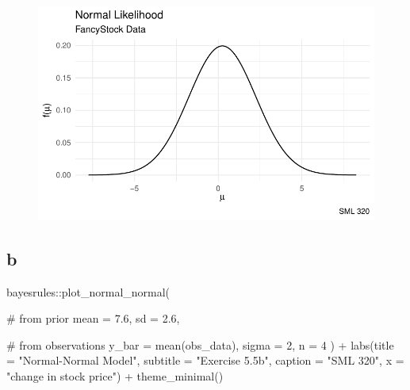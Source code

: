 \documentclass[
  letterpaper,
  DIV=11,
  numbers=noendperiod]{scrartcl}
\newenvironment{Shaded}{\begin{snugshade}}{\end{snugshade}}
\newcommand{\AttributeTok}[1]{\textcolor[rgb]{0.40,0.45,0.13}{#1}}
\newcommand{\CommentTok}[1]{\textcolor[rgb]{0.37,0.37,0.37}{#1}}
\newcommand{\DecValTok}[1]{\textcolor[rgb]{0.68,0.00,0.00}{#1}}
\newcommand{\FloatTok}[1]{\textcolor[rgb]{0.68,0.00,0.00}{#1}}
\newcommand{\FunctionTok}[1]{\textcolor[rgb]{0.28,0.35,0.67}{#1}}
\newcommand{\NormalTok}[1]{\textcolor[rgb]{0.00,0.23,0.31}{#1}}
\newcommand{\SpecialCharTok}[1]{\textcolor[rgb]{0.37,0.37,0.37}{#1}}
\newcommand{\StringTok}[1]{\textcolor[rgb]{0.13,0.47,0.30}{#1}}
\begin{document}
\begin{figure}[H]

{\centering \includegraphics{ps4_code_files/figure-pdf/unnamed-chunk-9-1.pdf}

}

\end{figure}

\hypertarget{b-3}{%
\subsection{b}\label{b-3}}

\begin{Shaded}
\begin{Highlighting}[]
\NormalTok{bayesrules}\SpecialCharTok{::}\FunctionTok{plot\_normal\_normal}\NormalTok{(}
  
  \CommentTok{\# from prior}
  \AttributeTok{mean =} \FloatTok{7.6}\NormalTok{, }\AttributeTok{sd =} \FloatTok{2.6}\NormalTok{,}
  
  \CommentTok{\# from observations}
  \AttributeTok{y\_bar =} \FunctionTok{mean}\NormalTok{(obs\_data), }\AttributeTok{sigma =} \DecValTok{2}\NormalTok{, }\AttributeTok{n =} \DecValTok{4}
\NormalTok{) }\SpecialCharTok{+}
  \FunctionTok{labs}\NormalTok{(}\AttributeTok{title =} \StringTok{"Normal{-}Normal Model"}\NormalTok{,}
       \AttributeTok{subtitle =} \StringTok{"Exercise 5.5b"}\NormalTok{,}
       \AttributeTok{caption =} \StringTok{"SML 320"}\NormalTok{,}
       \AttributeTok{x =} \StringTok{"change in stock price"}\NormalTok{) }\SpecialCharTok{+}
  \FunctionTok{theme\_minimal}\NormalTok{()}
\end{Highlighting}
\end{Shaded}
\end{document}
